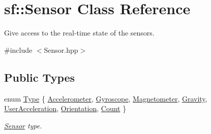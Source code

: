 \hypertarget{classsf_1_1_sensor}{}\section{sf\+:\+:Sensor Class Reference}
\label{classsf_1_1_sensor}


Give access to the real-\/time state of the sensors.  




{\ttfamily \#include $<$Sensor.\+hpp$>$}

\subsection*{Public Types}
\begin{DoxyCompactItemize}
\item 
enum \hyperlink{classsf_1_1_sensor_a687375af3ab77b818fca73735bcaea84}{Type} \{ \newline
\hyperlink{classsf_1_1_sensor_a687375af3ab77b818fca73735bcaea84a11bc58199593e217de23641755ecc867}{Accelerometer}, 
\hyperlink{classsf_1_1_sensor_a687375af3ab77b818fca73735bcaea84a1c43984aacd29b1fda5356883fb19656}{Gyroscope}, 
\hyperlink{classsf_1_1_sensor_a687375af3ab77b818fca73735bcaea84ae706bb678bde8d3c370e246ffde6a63d}{Magnetometer}, 
\hyperlink{classsf_1_1_sensor_a687375af3ab77b818fca73735bcaea84afab4d098cc64e791a0c4a9ef6b32db92}{Gravity}, 
\newline
\hyperlink{classsf_1_1_sensor_a687375af3ab77b818fca73735bcaea84ad3a399e0025892b7c53e8767cebb9215}{User\+Acceleration}, 
\hyperlink{classsf_1_1_sensor_a687375af3ab77b818fca73735bcaea84aa428c5260446555de87c69b65f6edf00}{Orientation}, 
\hyperlink{classsf_1_1_sensor_a687375af3ab77b818fca73735bcaea84afcb4a80eb9e3f927c5837207a1b9eb29}{Count}
 \}\begin{DoxyCompactList}\small\item\em \hyperlink{classsf_1_1_sensor}{Sensor} type. \end{DoxyCompactList}
\end{DoxyCompactItemize}
